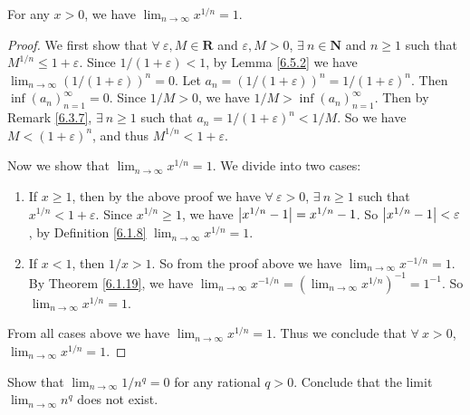 \begin{lemma}\label{6.5.3}
    For any \(x > 0\), we have \(\lim_{n \to \infty} x^{1 / n} = 1\).
\end{lemma}

\begin{proof}
    We first show that \(\forall\ \varepsilon, M \in \mathbf{R}\) and \(\varepsilon, M > 0\), \(\exists\ n \in \mathbf{N}\) and \(n \geq 1\) such that \(M^{1 / n} \leq 1 + \varepsilon\).
    Since \(1 / (1 + \varepsilon) < 1\), by Lemma \ref{6.5.2} we have \(\lim_{n \to \infty} (1 / (1 + \varepsilon))^n = 0\).
    Let \(a_n = (1 / (1 + \varepsilon))^n = 1 / (1 + \varepsilon)^n\).
    Then \(\inf(a_n)_{n = 1}^\infty = 0\).
    Since \(1 / M > 0\), we have \(1 / M > \inf(a_n)_{n = 1}^\infty\).
    Then by Remark \ref{6.3.7}, \(\exists\ n \geq 1\) such that \(a_n = 1 / (1 + \varepsilon)^n < 1 / M\).
    So we have \(M < (1 + \varepsilon)^n\), and thus \(M^{1 / n} < 1 + \varepsilon\).

    Now we show that \(\lim_{n \to \infty} x^{1 / n} = 1\).
    We divide into two cases:
    \begin{enumerate}
        \item If \(x \geq 1\), then by the above proof we have \(\forall\ \varepsilon > 0\), \(\exists\ n \geq 1\) such that \(x^{1 / n} < 1 + \varepsilon\).
              Since \(x^{1 / n} \geq 1\), we have \(\abs*{x^{1 / n} - 1} = x^{1 / n} - 1\).
              So \(\abs*{x^{1 / n} - 1} < \varepsilon\), by Definition \ref{6.1.8} \(\lim_{n \to \infty} x^{1 / n} = 1\).
        \item If \(x < 1\), then \(1 / x > 1\).
              So from the proof above we have \(\lim_{n \to \infty} x^{-1 / n} = 1\).
              By Theorem \ref{6.1.19}, we have \(\lim_{n \to \infty} x^{-1 / n} = (\lim_{n \to \infty} x^{1 / n})^{-1} = 1^{-1}\).
              So \(\lim_{n \to \infty} x^{1 / n} = 1\).
    \end{enumerate}
    From all cases above we have \(\lim_{n \to \infty} x^{1 / n} = 1\).
    Thus we conclude that \(\forall\ x > 0\), \(\lim_{n \to \infty} x^{1 / n} = 1\).
\end{proof}

\exercisesection

\begin{exercise}\label{ex 6.5.1}
    Show that \(\lim_{n \to \infty} 1 / n^q = 0\) for any rational \(q > 0\).
    Conclude that the limit \(\lim_{n \to \infty} n^q\) does not exist.
\end{exercise}


